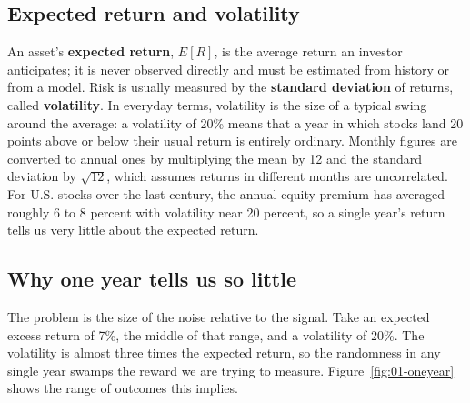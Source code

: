\subsection{Expected return and volatility}
\label{sec:01-expret}

An asset's \textbf{expected return}, $E[R]$, is the average return an investor anticipates; it is never observed directly and must be estimated from history or from a model. Risk is usually measured by the \textbf{standard deviation} of returns, called \textbf{volatility}. In everyday terms, volatility is the size of a typical swing around the average: a volatility of 20\% means that a year in which stocks land 20 points above or below their usual return is entirely ordinary. Monthly figures are converted to annual ones by multiplying the mean by 12 and the standard deviation by $\sqrt{12}$, which assumes returns in different months are uncorrelated. For U.S. stocks over the last century, the annual equity premium has averaged roughly 6 to 8 percent with volatility near 20 percent, so a single year's return tells us very little about the expected return.

\subsection{Why one year tells us so little}

The problem is the size of the noise relative to the signal. Take an expected excess return of 7\%, the middle of that range, and a volatility of 20\%. The volatility is almost three times the expected return, so the randomness in any single year swamps the reward we are trying to measure. Figure~\ref{fig:01-oneyear} shows the range of outcomes this implies.

